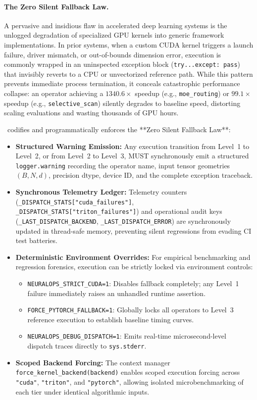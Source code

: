 \paragraph{The Zero Silent Fallback Law.}
A pervasive and insidious flaw in accelerated deep learning systems is the unlogged degradation of specialized GPU kernels into generic framework implementations. In prior systems, when a custom CUDA kernel triggers a launch failure, driver mismatch, or out-of-bounds dimension error, execution is commonly wrapped in an uninspected exception block (\texttt{try...except: pass}) that invisibly reverts to a CPU or unvectorized reference path. While this pattern prevents immediate process termination, it conceals catastrophic performance collapse: an operator achieving a $1340.6\times$ speedup (e.g., \texttt{moe\_routing}) or $99.1\times$ speedup (e.g., \texttt{selective\_scan}) silently degrades to baseline speed, distorting scaling evaluations and wasting thousands of GPU hours.

\neuralops\ codifies and programmatically enforces the **Zero Silent Fallback Law**:
\begin{itemize}
    \item \textbf{Structured Warning Emission:} Any execution transition from Level~1 to Level~2, or from Level~2 to Level~3, MUST synchronously emit a structured \texttt{logger.warning} recording the operator name, input tensor geometries $(B, N, d)$, precision dtype, device ID, and the complete exception traceback.
    \item \textbf{Synchronous Telemetry Ledger:} Telemetry counters (\texttt{\_DISPATCH\_STATS["cuda\_failures"]}, \texttt{\_DISPATCH\_STATS["triton\_failures"]}) and operational audit keys (\texttt{\_LAST\_DISPATCH\_BACKEND}, \texttt{\_LAST\_DISPATCH\_ERROR}) are synchronously updated in thread-safe memory, preventing silent regressions from evading CI test batteries.
    \item \textbf{Deterministic Environment Overrides:} For empirical benchmarking and regression forensics, execution can be strictly locked via environment controls:
    \begin{itemize}
        \item \texttt{NEURALOPS\_STRICT\_CUDA=1}: Disables fallback completely; any Level~1 failure immediately raises an unhandled runtime assertion.
        \item \texttt{FORCE\_PYTORCH\_FALLBACK=1}: Globally locks all operators to Level~3 reference execution to establish baseline timing curves.
        \item \texttt{NEURALOPS\_DEBUG\_DISPATCH=1}: Emits real-time microsecond-level dispatch traces directly to \texttt{sys.stderr}.
    \end{itemize}
    \item \textbf{Scoped Backend Forcing:} The context manager \texttt{force\_kernel\_backend(backend)} enables scoped execution forcing across \texttt{"cuda"}, \texttt{"triton"}, and \texttt{"pytorch"}, allowing isolated microbenchmarking of each tier under identical algorithmic inputs.
\end{itemize}

